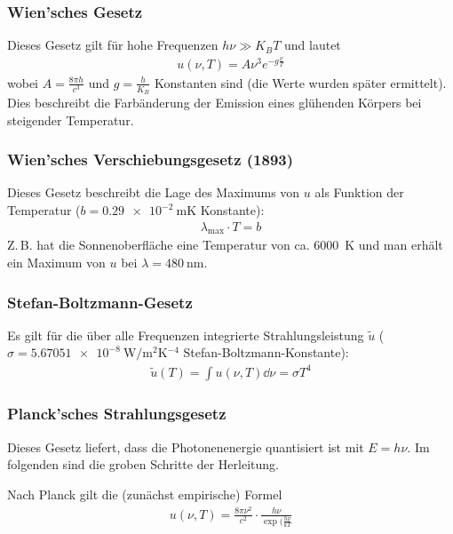 \subsubsection{Wien'sches Gesetz}
Dieses Gesetz gilt für hohe Frequenzen $h\nu\gg K_BT$ 
und lautet
\begin{gather*}
  u(\nu, T) = A\nu^3e^{-g\frac{\nu}{T}}
\end{gather*}
wobei $A=\frac{8\pi h}{c^3}$ und $g=\frac{h}{K_B}$ Konstanten sind
(die Werte wurden später ermittelt).
Dies beschreibt die Farbänderung der Emission eines glühenden Körpers bei
steigender Temperatur.

\subsubsection{Wien'sches Verschiebungsgesetz (1893)}
Dieses Gesetz beschreibt die Lage des Maximums von $u$ als Funktion
der Temperatur
($b=\SI{0.29e-2}{\meter\kelvin}$%
Konstante):
\begin{gather*}
  \lambda_\text{max}\cdot T = b
\end{gather*}
Z.\,B. hat die Sonnenoberfläche eine Temperatur von
ca. \SI{6000}{\kelvin} und man erhält ein Maximum von $u$ bei
$\lambda=\SI{480}{\nano\meter}$.

\subsubsection{Stefan-Boltzmann-Gesetz}
Es gilt für die über alle Frequenzen integrierte Strahlungsleistung
$\widetilde u$
($\sigma = \SI{5.67051e-8}{\watt\per\square\meter\kelvin^{-4}}$%
Stefan-Boltzmann-Konstante):
\begin{gather*}
  \widetilde u(T) = \int u(\nu,T)\dd\nu = \sigma T^4
\end{gather*}

\subsubsection{Planck'sches Strahlungsgesetz}
Dieses Gesetz liefert, dass die Photonenenergie quantisiert ist mit
$E=h\nu$. Im folgenden sind die groben Schritte der Herleitung.

Nach Planck gilt die (zunächst empirische) Formel
\begin{gather}
  u(\nu, T) 
  = \frac{8\pi\nu^2}{c^2}
  \cdot \frac{h\nu}{\exp(\frac{h\nu}{kT}}
  \label{planck}
\end{gather}

